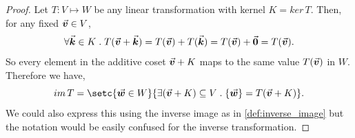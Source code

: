 \documentclass[MathsNotesBase.tex]{subfiles}
\begin{document}
{		\medskip
		\begin{proof}
			Let ${ T: V \longmapsto W }$ be any linear transformation with kernel ${ K = ker\,T }$. Then, for any fixed ${ \vec{\bm{v}} \in V }$,
			\[ \forall \vec{\bm{k}} \in K \;.\; T(\vec{\bm{v}} + \vec{\bm{k}}) = T(\vec{\bm{v}}) + T(\vec{\bm{k}}) = T(\vec{\bm{v}}) + \vec{\bm{0}} = T(\vec{\bm{v}}). \]
			So every element in the additive coset ${ \vec{\bm{v}} + K }$ maps to the same value $T(\vec{\bm{v}})$ in $W$. Therefore we have,
			\[ im\,T = \setc{\w \in W}{\exists (\v + K) \subseteq V \logicsep \{\w\} = T(\v + K)}. \]
			We could also express this using the inverse image as in \ref{def:inverse_image} but the notation would be easily confused for the inverse transformation.
		\end{proof}
	
}
\end{document}
